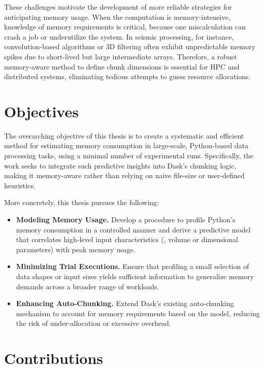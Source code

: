 These challenges motivate the development of more reliable strategies for anticipating memory usage.
When the computation is memory-intensive, knowledge of memory requirements is critical, because one miscalculation can crash a job or underutilize the system.
In seismic processing, for instance, convolution-based algorithms or \ac{3D} filtering often exhibit unpredictable memory spikes due to short-lived but large intermediate arrays.
Therefore, a robust memory-aware method to define chunk dimensions is essential for \ac{HPC} and distributed systems, eliminating tedious attempts to guess resource allocations.


\section{Objectives}
\label{sec:intro-objectives}

The overarching objective of this thesis is to create a systematic and efficient method for estimating memory consumption in large-scale, Python-based data processing tasks, using a minimal number of experimental runs.
Specifically, the work seeks to integrate such predictive insights into Dask's chunking logic, making it memory-aware rather than relying on naive file-size or user-defined heuristics.

More concretely, this thesis pursues the following:
\begin{itemize}
    \item \textbf{Modeling Memory Usage.}
    Develop a procedure to profile Python's memory consumption in a controlled manner and derive a predictive model that correlates high-level input characteristics (\eg, volume or dimensional parameters) with peak memory usage.
    \item \textbf{Minimizing Trial Executions.}
    Ensure that profiling a small selection of data shapes or input sizes yields sufficient information to generalize memory demands across a broader range of workloads.
    \item \textbf{Enhancing Auto-Chunking.}
    Extend Dask's existing auto-chunking mechanism to account for memory requirements based on the model, reducing the risk of under-allocation or excessive overhead.
\end{itemize}


\section{Contributions}
\label{sec:intro-contributions}


